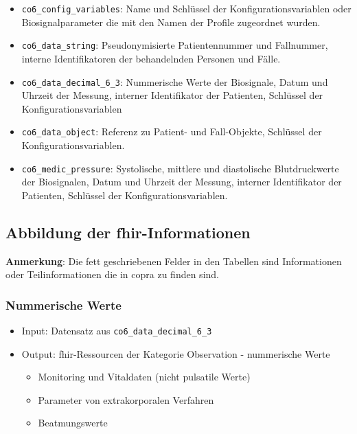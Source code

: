 \begin{itemize}
  \item \texttt{co6\_config\_variables}: Name und Schlüssel der Konfigurationsvariablen oder Biosignalparameter die mit den Namen der Profile zugeordnet wurden.
  \item \texttt{co6\_data\_string}: Pseudonymisierte Patientennummer und Fallnummer, interne Identifikatoren der behandelnden Personen und Fälle.
  \item \texttt{co6\_data\_decimal\_6\_3}: Nummerische Werte der Biosignale, Datum und Uhrzeit der Messung, interner Identifikator der Patienten, Schlüssel der Konfigurationsvariablen
  \item \texttt{co6\_data\_object}: Referenz zu Patient- und Fall-Objekte, Schlüssel der Konfigurationsvariablen.
  \item \texttt{co6\_medic\_pressure}: Systolische, mittlere und diastolische Blutdruckwerte der Biosignalen, Datum und Uhrzeit der Messung, interner Identifikator der Patienten, Schlüssel der Konfigurationsvariablen.
\end{itemize}

\subsection{Abbildung der \acs{fhir}-Informationen} \label{subsec:coprareflexfhir}

\noindent \textbf{Anmerkung}: Die fett geschriebenen Felder in den Tabellen sind Informationen oder Teilinformationen die in \ac{copra} zu finden sind.

\subsubsection{Nummerische Werte} \label{subsub:numbvalues}

\begin{itemize}
\item Input: Datensatz aus \texttt{co6\_data\_decimal\_6\_3}
\item Output: \ac{fhir}-Ressourcen der Kategorie \glqq Observation\grqq{} - nummerische Werte
\begin{itemize}
	\item Monitoring und Vitaldaten (nicht pulsatile Werte)
	\item Parameter von extrakorporalen Verfahren
	\item Beatmungswerte 
\end{itemize}
\end{itemize}

